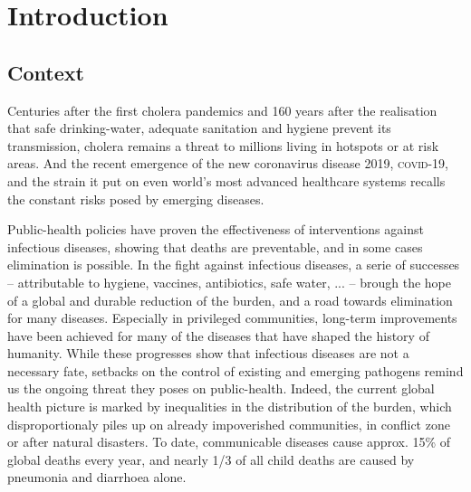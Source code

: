 \chapter*{Introduction} 

 \section{Context}
 Centuries after the first cholera pandemics and 160 years after the realisation that safe drinking-water, adequate sanitation and hygiene prevent its transmission, cholera remains a threat to millions living in hotspots or at risk areas. And the recent emergence of the new coronavirus disease 2019, \textsc{covid}-19, and the strain it put on even world's most advanced healthcare systems recalls the constant risks posed by emerging diseases. 
 
 Public-health policies have proven the effectiveness of interventions against infectious diseases, showing that deaths are preventable, and in some cases elimination is possible. In the fight against infectious diseases, a serie of successes -- attributable to \eg hygiene, vaccines, antibiotics, safe water, ... -- brough the hope of a global and durable reduction of the burden, and a road towards elimination for many diseases. Especially in privileged communities, long-term improvements have been achieved for many of the diseases that have shaped the history of humanity. While these progresses show that infectious diseases are not a necessary fate, setbacks on the control of existing and emerging pathogens remind us the ongoing threat they poses on public-health. 
  Indeed, the current global health picture is marked by inequalities in the distribution of the burden, which disproportionaly piles up on already impoverished communities, in conflict zone or after natural disasters. To date, communicable diseases cause approx. 15\% of global deaths every year\cite[-4\baselineskip][tab. 1, excl. non-transmissible neonatal and maternal diseases and nutritional diseases; pre-\textsc{covid}-19 estimates]{Roth:GlobalRegionalNational:2018}, and nearly 1/3 of all child deaths are caused by pneumonia and diarrhoea alone\cite[][\textsc{M} deaths among under 5, every year.]{WHO:EndingPreventableChild:2013}.  
 
